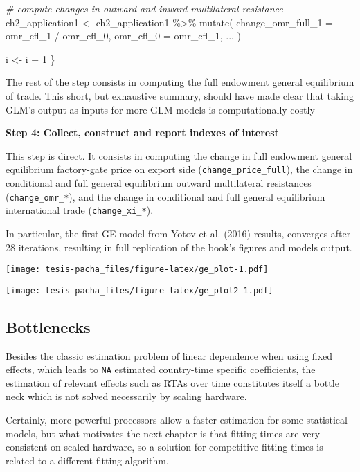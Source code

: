 \documentclass[12pt,reqno,oneside,pdftex]{formato-puc/puctesis} %
\newenvironment{Shaded}{\begin{snugshade}}{\end{snugshade}}
\newcommand{\AttributeTok}[1]{\textcolor[rgb]{0.77,0.63,0.00}{#1}}
\newcommand{\CommentTok}[1]{\textcolor[rgb]{0.56,0.35,0.01}{\textit{#1}}}
\newcommand{\DecValTok}[1]{\textcolor[rgb]{0.00,0.00,0.81}{#1}}
\newcommand{\FunctionTok}[1]{\textcolor[rgb]{0.00,0.00,0.00}{#1}}
\newcommand{\NormalTok}[1]{#1}
\newcommand{\OtherTok}[1]{\textcolor[rgb]{0.56,0.35,0.01}{#1}}
\newcommand{\SpecialCharTok}[1]{\textcolor[rgb]{0.00,0.00,0.00}{#1}}
\begin{document}
\begin{Shaded}
\begin{Highlighting}[]
  \CommentTok{\# compute changes in outward and inward multilateral resistance}
\NormalTok{  ch2\_application1 }\OtherTok{\textless{}{-}}\NormalTok{ ch2\_application1 }\SpecialCharTok{\%\textgreater{}\%}
    \FunctionTok{mutate}\NormalTok{(}
      \AttributeTok{change\_omr\_full\_1 =}\NormalTok{ omr\_cfl\_1 }\SpecialCharTok{/}\NormalTok{ omr\_cfl\_0,}
      \AttributeTok{omr\_cfl\_0 =}\NormalTok{ omr\_cfl\_1,}
\NormalTok{      ...}
\NormalTok{    )}

\NormalTok{  i }\OtherTok{\textless{}{-}}\NormalTok{ i }\SpecialCharTok{+} \DecValTok{1}
\NormalTok{\}}
\end{Highlighting}
\end{Shaded}

The rest of the step consists in computing the full endowment general
equilibrium of trade. This short, but exhaustive summary, should have
made clear that taking GLM's output as inputs for more GLM models is
computationally costly

\textbf{Step 4: Collect, construct and report indexes of interest}

This step is direct. It consists in computing the change in full
endowment general equilibrium factory-gate price on export side
(\texttt{change\_price\_full}), the change in conditional and full
general equilibrium outward multilateral resistances
(\texttt{change\_omr\_*}), and the change in conditional and full
general equilibrium international trade (\texttt{change\_xi\_*}).

In particular, the first GE model from Yotov et al. (2016) results,
converges after 28 iterations, resulting in full replication of the
book's figures and models output.

\texttt{[image: tesis-pacha\_files/figure-latex/ge\_plot-1.pdf]}

\texttt{[image: tesis-pacha\_files/figure-latex/ge\_plot2-1.pdf]}

\hypertarget{bottlenecks}{%
\subsection{Bottlenecks}\label{bottlenecks}}

Besides the classic estimation problem of linear dependence when using
fixed effects, which leads to \texttt{NA} estimated country-time
specific coefficients, the estimation of relevant effects such as RTAs
over time constitutes itself a bottle neck which is not solved
necessarily by scaling hardware.

Certainly, more powerful processors allow a faster estimation for some
statistical models, but what motivates the next chapter is that fitting
times are very consistent on scaled hardware, so a solution for
competitive fitting times is related to a different fitting algorithm.
\end{document}
